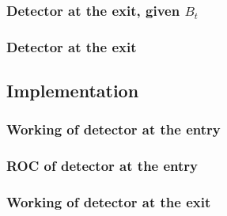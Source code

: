 \documentclass[11pt]{article}
\begin{document}

\subsubsection{Detector at the exit, given $B_{t}$}
\label{subsubsec:exitDetector}


\subsubsection{Detector at the exit}
\label{subsubsec:exitDetectorGeneralised}


\subsection{Implementation}
\label{subsec:partA_implementation}


\subsubsection{Working of detector at the entry}
\label{subsubsec:entryDetector_working}


\subsubsection{ROC of detector at the entry}
\label{subsubsec:entryDetector_roc}


\subsubsection{Working of detector at the exit}
\label{subsubsec:exitDetector_working}
\end{document}
